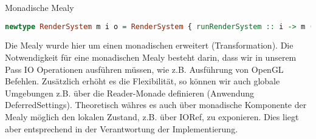 Monadische Mealy
\begin{lstlisting}[language=Haskell]
newtype RenderSystem m i o = RenderSystem { runRenderSystem :: i -> m (o, RenderSystem m i o) }
\end{lstlisting}

Die Mealy wurde hier um einen monadischen erweitert (Transformation). Die Notwendigkeit für eine monadischen Mealy besteht darin, dass wir in unserem Pass IO Operationen ausführen müssen, wie z.B. Ausführung von OpenGL Befehlen. Zusätzlich erhöht es die Flexibilität, so können wir auch globale Umgebungen z.B. über die Reader-Monade definieren (Anwendung DeferredSettings). Theoretisch währes es auch über monadische Komponente der Mealy möglich den lokalen Zustand, z.B. über IORef, zu exponieren. Dies liegt aber entsprechend in der Verantwortung der Implementierung.
